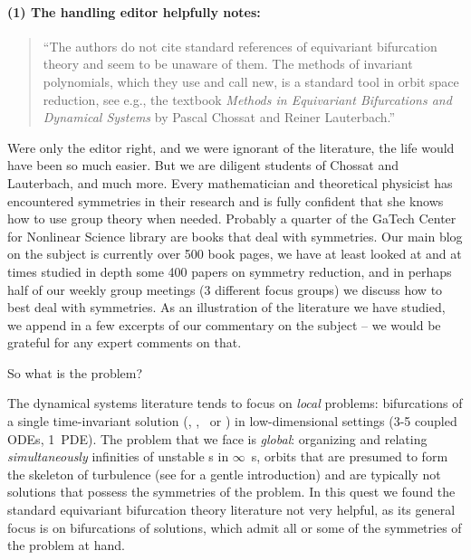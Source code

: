 \documentclass[12pt]{article}
\begin{document}
\paragraph{(1) The handling editor helpfully notes:}

\begin{quote}
    ``The
authors do not cite standard references of equivariant bifurcation
theory and seem to be unaware of them. The methods of invariant
polynomials, which they use and call new, is a standard tool in
orbit space reduction, see e.g., the textbook \emph{Methods in
Equivariant Bifurcations and Dynamical Systems} by Pascal Chossat
and Reiner Lauterbach.''
\end{quote}

Were only the editor right, and we were ignorant of the literature,
the life would have been so much easier. But we are diligent students of
Chossat and Lauterbach, and much more.  Every mathematician and
theoretical physicist has encountered symmetries in their research and is
fully confident that she knows how to use group theory when
needed. Probably a  quarter of the GaTech Center for Nonlinear
Science library are books that deal with symmetries. Our main blog on the
subject is currently over 500 book pages, we have at least looked at and
at times studied in depth some 400 papers on symmetry reduction,
and in perhaps half of our weekly group meetings (3 different focus groups)
we discuss how to best deal with symmetries. As an
illustration of the literature we have studied, we append in
 a few excerpts of our commentary on the
subject -- we would be grateful for any expert comments on that.

So what is the problem?

The dynamical systems literature tends to
focus on \emph{local} problems: bifurcations of a single time-invariant
solution (\eqv, \reqv, \po\ or \rpo) in low-dimensional settings (3-5
coupled ODEs, 1\dmn\ PDE). The problem that we face is \emph{global}:
organizing and relating \emph{simultaneously} infinities of unstable \rpo
s in $\infty$\dmn\ \statesp s, orbits that are presumed to form the skeleton of
turbulence (see  for a gentle introduction) and are
typically not solutions that possess the symmetries of the problem.
In this quest we found the standard equivariant bifurcation theory
literature not very helpful, as its general focus is on
bifurcations of solutions, which admit all or some of the symmetries
of the problem at hand.
\end{document}
